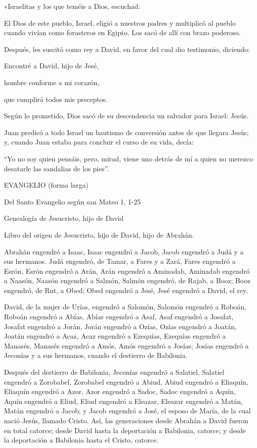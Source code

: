 \begin{body}
\begin{body}
«Israelitas y los que teméis a Dios, escuchad:

El Dios de este pueblo, Israel, eligió a nuestros padres y multiplicó al
pueblo cuando vivían como forasteros en Egipto. Los sacó de allí con
brazo poderoso.

Después, les suscitó como rey a David, en favor del cual dio testimonio,
diciendo:

Encontré a David, hijo de Jesé,

hombre conforme a mi corazón,

que cumplirá todos mis preceptos.

Según lo prometido, Dios sacó de su descendencia un salvador para
Israel: Jesús.

Juan predicó a todo Israel un bautismo de conversión antes de que
llegara Jesús; y, cuando Juan estaba para concluir el curso de su vida,
decía:

``Yo no soy quien pensáis, pero, mirad, viene uno detrás de mí a quien
no merezco desatarle las sandalias de los pies''.

EVANGELIO (forma larga)

Del Santo Evangelio según san Mateo 1, 1-25

Genealogía de Jesucristo, hijo de David

Libro del origen de Jesucristo, hijo de David, hijo de Abrahán.

Abrahán engendró a Isaac, Isaac engendró a Jacob, Jacob engendró a Judá
y a sus hermanos. Judá engendró, de Tamar, a Fares y a Zará, Fares
engendró a Esrón, Esrón engendró a Arán, Arán engendró a Aminadab,
Aminadab engendró a Naasón, Naasón engendró a Salmón, Salmón engendró,
de Rajab, a Booz; Booz engendró, de Rut, a Obed; Obed engendró a Jesé,
Jesé engendró a David, el rey.

David, de la mujer de Urías, engendró a Salomón, Salomón engendró a
Roboán, Roboán engendró a Abías, Abías engendró a Asaf, Asaf engendró a
Josafat, Josafat engendró a Jorán, Jorán engendró a Ozías, Ozías
engendró a Joatán, Joatán engendró a Acaz, Acaz engendró a Ezequías,
Ezequías engendró a Manasés, Manasés engendró a Amós, Amós engendró a
Josías; Josías engendró a Jeconías y a sus hermanos, cuando el destierro
de Babilonia.

Después del destierro de Babilonia, Jeconías engendró a Salatiel,
Salatiel engendró a Zorobabel, Zorobabel engendró a Abiud, Abiud
engendró a Eliaquín, Eliaquín engendró a Azor, Azor engendró a Sadoc,
Sadoc engendró a Aquín, Aquín engendró a Eliud, Eliud engendró a
Eleazar, Eleazar engendró a Matán, Matán engendró a Jacob; y Jacob
engendró a José, el esposo de María, de la cual nació Jesús, llamado
Cristo. Así, las generaciones desde Abrahán a David fueron en total
catorce; desde David hasta la deportación a Babilonia, catorce; y desde
la deportación a Babilonia hasta el Cristo, catorce.


\end{body}
\end{body}
